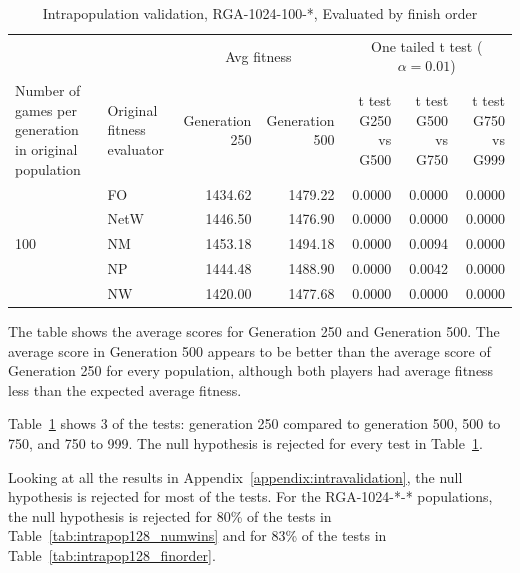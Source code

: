 \begin{table}[ht]
  \centering
  \caption{Intrapopulation validation, RGA-1024-100-*, Evaluated by finish order}
    \begin{tabularx}{\linewidth}{|p{1in}|p{1in}|r|r|r|r|r|}
    \cline{3-7}
    \multicolumn{1}{l}{} &  & \multicolumn{2}{c|}{Avg fitness} &
    \multicolumn{3}{c|}{One tailed t test (\(\alpha=0.01\))} \\
    \cline{1-7}
    Number of games per generation in original population
    & Original fitness evaluator
    & \multicolumn{1}{p{0.7in}|}{Generation 250}
    & \multicolumn{1}{p{0.7in}|}{Generation 500}
    & \multicolumn{1}{X|}{t test G250 vs G500}
    & \multicolumn{1}{X|}{t test G500 vs G750}
    & \multicolumn{1}{X|}{t test G750 vs G999} \\
    \cline{1-7}
      \multirow{5}{*}{100} 
      & FO & 1434.62 & 1479.22 & 0.0000 & 0.0000 & 0.0000 \\
\cline{2-7}             
      & NetW & 1446.50 & 1476.90 & 0.0000 & 0.0000 & 0.0000 \\
\cline{2-7}     
      & NM & 1453.18 & 1494.18 & 0.0000 & 0.0094 & 0.0000 \\
\cline{2-7}    
      & NP & 1444.48 & 1488.90 & 0.0000 & 0.0042 & 0.0000 \\
\cline{2-7}   
      & NW & 1420.00 & 1477.68 & 0.0000 & 0.0000 & 0.0000 \\
      \cline{1-7}
    \end{tabularx}%
  \label{tab:validationRGA1024}%
\end{table}%

The table shows the average scores for Generation 250 and Generation 500. The
average score in Generation 500 appears to be better than the average score of
Generation 250 for every population, although both players had average fitness
less than the expected average fitness.

Table~\ref{tab:validationRGA1024} shows 3 of the tests: generation 250 compared
to generation 500, 500 to 750, and 750 to 999. The null hypothesis is rejected
for every test in Table~\ref{tab:validationRGA1024}. 

Looking at all the results in Appendix~\ref{appendix:intravalidation}, 
the null hypothesis is rejected for most of the tests. For the RGA-1024-*-*
populations, the null hypothesis is rejected for 80\% of the tests in
Table~\ref{tab:intrapop128_numwins} and for 83\% of the tests in
Table~\ref{tab:intrapop128_finorder}.

